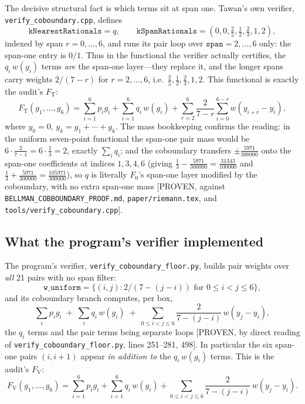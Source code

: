 \documentclass[11pt]{article}
\newcommand{\Fv}{F_{\mathrm{V}}}
\newcommand{\Ft}{F_{\mathrm{T}}}
\newcommand{\Fzero}{F_{0}}
\begin{document}
The decisive structural fact is which terms sit at span one. Tawan's own
verifier, \texttt{verify\_coboundary.cpp}, defines
\[
\texttt{kNearestRationals} = q, \qquad
\texttt{kSpanRationals} = (0,0,\tfrac25,\tfrac12,\tfrac23,1,2),
\]
indexed by span $r = 0,\dots,6$, and runs its pair loop over
$\texttt{span} = 2,\dots,6$ only: the span-one entry is $0/1$. Thus in the
functional the verifier actually certifies, the $q_i\,w(g_i)$ terms \emph{are}
the span-one layer---they replace it, and the longer spans carry weights
$2/(7-r)$ for $r=2,\dots,6$, i.e.\ $\tfrac25,\tfrac12,\tfrac23,1,2$. This
functional is exactly the audit's $\Ft$:
\begin{equation}
\label{eq:FT}
\Ft(g_1,\dots,g_6) = \sum_{i=1}^6 p_i g_i + \sum_{i=1}^6 q_i\, w(g_i)
 + \sum_{r=2}^{6}\frac{2}{7-r}\sum_{i=0}^{6-r} w(y_{i+r}-y_i),
\end{equation}
where $y_0=0$, $y_k = g_1+\cdots+g_k$. The mass bookkeeping confirms the
reading: in the uniform seven-point functional the span-one pair mass would be
$6\cdot\tfrac{2}{7-1} = 6\cdot\tfrac13 = 2$, exactly $\sum_i q_i$; and the
coboundary transfers $\pm\tfrac{5971}{300000}$ onto the span-one coefficients at
indices $1,3,4,6$ (giving $\tfrac13 - \tfrac{5971}{300000} = \tfrac{31343}{100000}$
and $\tfrac13 + \tfrac{5971}{300000} = \tfrac{105971}{300000}$), so $q$ is
literally $\Fzero$'s span-one layer modified by the coboundary, with no extra
span-one mass [PROVEN, against \texttt{BELLMAN\_COBBOUNDARY\_PROOF.md},
\texttt{paper/riemann.tex}, and \texttt{tools/verify\_coboundary.cpp}].

\subsection{What the program's verifier implemented}
\label{sec:code}

The program's verifier, \texttt{verify\_coboundary\_floor.py}, builds pair
weights over \emph{all} 21 pairs with no span filter:
\[
\texttt{w\_uniform} = \{(i,j): 2/(7-(j-i)) \text{ for } 0 \le i < j \le 6\},
\]
and its coboundary branch computes, per box,
\[
\sum_i p_i g_i \;+\; \sum_i q_i\, w(g_i) \;+\;
\sum_{0\le i<j\le 6} \frac{2}{7-(j-i)}\, w(y_j-y_i),
\]
the $q_i$ terms and the pair terms being separate loops [PROVEN, by direct
reading of \texttt{verify\_coboundary\_floor.py}, lines 251--281, 498]. In
particular the six span-one pairs $(i,i+1)$ appear \emph{in addition to} the
$q_i\,w(g_i)$ terms. This is the audit's $\Fv$:
\begin{equation}
\label{eq:FV}
\Fv(g_1,\dots,g_6) = \sum_{i=1}^6 p_i g_i + \sum_{i=1}^6 q_i\, w(g_i)
 + \sum_{0\le i<j\le 6} \frac{2}{7-(j-i)}\, w(y_j-y_i).
\end{equation}
\end{document}
